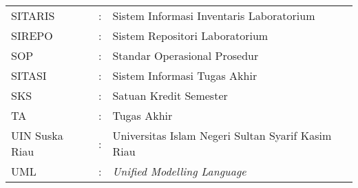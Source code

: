 \begin{tabular}{lll}
	SITARIS        & : & Sistem Informasi Inventaris Laboratorium                      \\
	SIREPO         & : & Sistem Repositori Laboratorium                                \\
	SOP            & : & Standar Operasional Prosedur                                  \\
	SITASI         & : & Sistem Informasi Tugas Akhir                                  \\
	SKS            & : & Satuan Kredit Semester                                        \\
	TA             & : & Tugas Akhir                                                   \\
	UIN Suska Riau & : & Universitas Islam Negeri Sultan Syarif Kasim Riau             \\
	UML            & : & \textit{Unified Modelling Language}                           \\
\end{tabular}